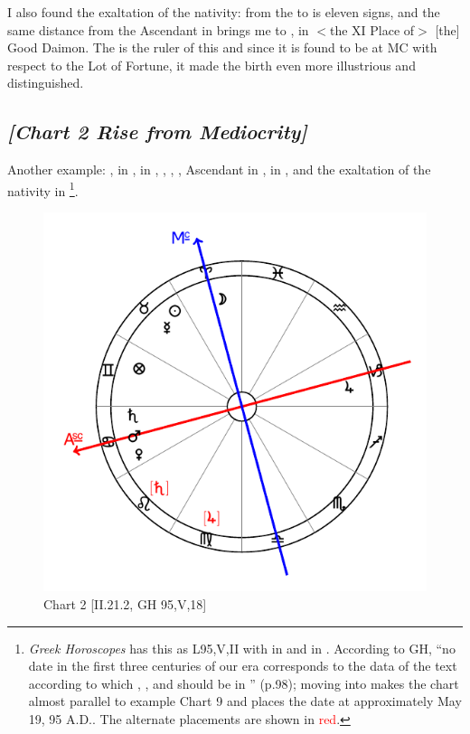 I also found the exaltation of the nativity: from the \Moon\xspace to \Taurus\xspace is eleven signs, and the same distance from the Ascendant in \Libra\xspace brings me to \Leo, in $<$the XI Place of$>$ [the] Good Daimon. The \Sun\xspace is the ruler of this and since it is found to be at MC with respect to the Lot of Fortune, it made the birth even more illustrious and distinguished.
\newpage
\subsection*{\textit{[Chart 2 Rise from Mediocrity]}}

Another example: \Sun, \Mercury\xspace in \Taurus, \Moon\xspace in \Aries, \Saturn, \Mars, \Venus, Ascendant in \Cancer,
\Jupiter\xspace in \Capricorn, \Fortune\xspace and the exaltation of the nativity in \Gemini
\footnote{\textit{Greek Horoscopes} has this as L95,V,II with \Saturn\xspace in \Leo\xspace and \Jupiter\xspace in \Virgo. According to GH, ``no date in the first three centuries of our era corresponds to the data of the text according to which \Saturn, \Mars, and \Venus\xspace should be in \Cancer'' (p.98); moving \Saturn\xspace into \Leo\xspace makes the chart almost parallel to example Chart 9 and places the date at approximately May 19, 95 A.D.. The alternate placements are shown in \textcolor{red}{red}.}.

\clearpage
\begin{figure}
\centering
\vspace{-20pt}
\includegraphics[width=.68\textwidth]{charts/2_21_2}
\caption{Chart 2 [II.21.2, GH 95,V,18]}
\label{fig:chart02}
\end{figure}

